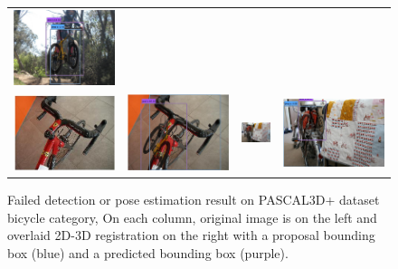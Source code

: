 \documentclass[10pt,twocolumn,letterpaper]{article}
\begin{document}
\begin{figure}[h]
\begin{tabular}{|cc|cc|}
  \includegraphics[width=0.22\linewidth]{supp/pas_bicycle17b.png}  \\ 
  \includegraphics[width=0.22\linewidth]{supp/pas_bicycle18a.png} &
  \includegraphics[width=0.22\linewidth]{supp/pas_bicycle18b.png} & 
  \includegraphics[width=0.22\linewidth]{supp/pas_bicycle19a.png}  &
  \includegraphics[width=0.22\linewidth]{supp/pas_bicycle19b.png}  \\   \hline
  \end{tabular}
\caption{Failed detection or pose estimation result on PASCAL3D+ dataset
  bicycle category, On each column, original image is on the left and overlaid
  2D-3D registration on the right with a proposal bounding box (blue) and a
  predicted bounding box (purple).} 
  \label{fig:pascal3d_bicycle_bad}
\end{figure}
\end{document}
